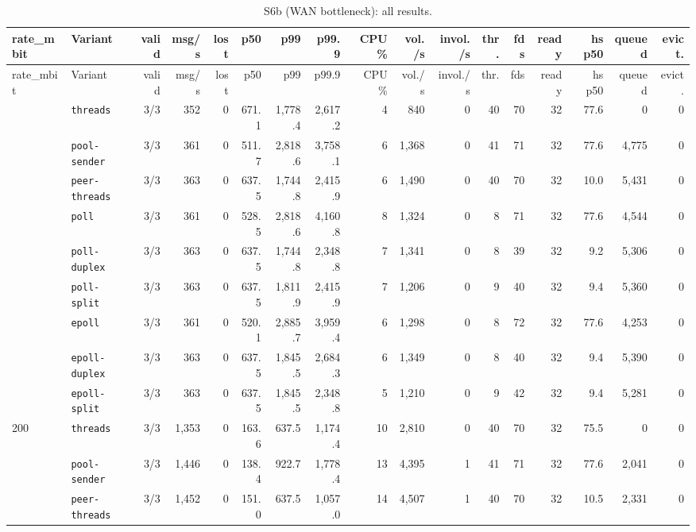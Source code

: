 \begin{longtable}{@{}llrrrrrrrrrrrrrrr@{}}
\caption{S6b (WAN bottleneck): all results.}\label{tab:full-S6b}\\
\toprule
rate\_mbit & Variant & valid & msg/s & lost & p50 & p99 & p99.9 & CPU \% & vol./s & invol./s & thr. & fds & ready & hs p50 & queued & evict. \\
\midrule
\endfirsthead
\toprule
rate\_mbit & Variant & valid & msg/s & lost & p50 & p99 & p99.9 & CPU \% & vol./s & invol./s & thr. & fds & ready & hs p50 & queued & evict. \\
\midrule
\endhead
\bottomrule
\endfoot
50 & \texttt{threads} & 3/3 & 352 & 0 & 671.1 & 1{,}778.4 & 2{,}617.2 & 4 & 840 & 0 & 40 & 70 & 32 & 77.6 & 0 & 0 \\
 & \texttt{pool-sender} & 3/3 & 361 & 0 & 511.7 & 2{,}818.6 & 3{,}758.1 & 6 & 1{,}368 & 0 & 41 & 71 & 32 & 77.6 & 4{,}775 & 0 \\
 & \texttt{peer-threads} & 3/3 & 363 & 0 & 637.5 & 1{,}744.8 & 2{,}415.9 & 6 & 1{,}490 & 0 & 40 & 70 & 32 & 10.0 & 5{,}431 & 0 \\
 & \texttt{poll} & 3/3 & 361 & 0 & 528.5 & 2{,}818.6 & 4{,}160.8 & 8 & 1{,}324 & 0 & 8 & 71 & 32 & 77.6 & 4{,}544 & 0 \\
 & \texttt{poll-duplex} & 3/3 & 363 & 0 & 637.5 & 1{,}744.8 & 2{,}348.8 & 7 & 1{,}341 & 0 & 8 & 39 & 32 & 9.2 & 5{,}306 & 0 \\
 & \texttt{poll-split} & 3/3 & 363 & 0 & 637.5 & 1{,}811.9 & 2{,}415.9 & 7 & 1{,}206 & 0 & 9 & 40 & 32 & 9.4 & 5{,}360 & 0 \\
 & \texttt{epoll} & 3/3 & 361 & 0 & 520.1 & 2{,}885.7 & 3{,}959.4 & 6 & 1{,}298 & 0 & 8 & 72 & 32 & 77.6 & 4{,}253 & 0 \\
 & \texttt{epoll-duplex} & 3/3 & 363 & 0 & 637.5 & 1{,}845.5 & 2{,}684.3 & 6 & 1{,}349 & 0 & 8 & 40 & 32 & 9.4 & 5{,}390 & 0 \\
 & \texttt{epoll-split} & 3/3 & 363 & 0 & 637.5 & 1{,}845.5 & 2{,}348.8 & 5 & 1{,}210 & 0 & 9 & 42 & 32 & 9.4 & 5{,}281 & 0 \\
\midrule
200 & \texttt{threads} & 3/3 & 1{,}353 & 0 & 163.6 & 637.5 & 1{,}174.4 & 10 & 2{,}810 & 0 & 40 & 70 & 32 & 75.5 & 0 & 0 \\
 & \texttt{pool-sender} & 3/3 & 1{,}446 & 0 & 138.4 & 922.7 & 1{,}778.4 & 13 & 4{,}395 & 1 & 41 & 71 & 32 & 77.6 & 2{,}041 & 0 \\
 & \texttt{peer-threads} & 3/3 & 1{,}452 & 0 & 151.0 & 637.5 & 1{,}057.0 & 14 & 4{,}507 & 1 & 40 & 70 & 32 & 10.5 & 2{,}331 & 0 \\

\end{longtable}

